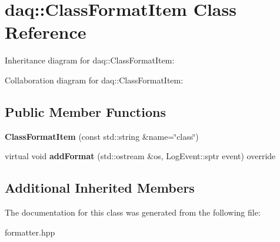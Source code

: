 \hypertarget{classdaq_1_1ClassFormatItem}{}\section{daq\+:\+:Class\+Format\+Item Class Reference}
\label{classdaq_1_1ClassFormatItem}


Inheritance diagram for daq\+:\+:Class\+Format\+Item\+:


Collaboration diagram for daq\+:\+:Class\+Format\+Item\+:
\subsection*{Public Member Functions}
\begin{DoxyCompactItemize}
\item 
\mbox{\label{classdaq_1_1ClassFormatItem_a215f92f00fcc89575e2675410a6217ff}} 
{\bfseries Class\+Format\+Item} (const std\+::string \&name=\char`\"{}class\char`\"{})
\item 
\mbox{\label{classdaq_1_1ClassFormatItem_a768f63b1dce13f3b782d376b9b87a64b}} 
virtual void {\bfseries add\+Format} (std\+::ostream \&os, Log\+Event\+::sptr event) override
\end{DoxyCompactItemize}
\subsection*{Additional Inherited Members}


The documentation for this class was generated from the following file\+:\begin{DoxyCompactItemize}
\item 
formatter.\+hpp\end{DoxyCompactItemize}
